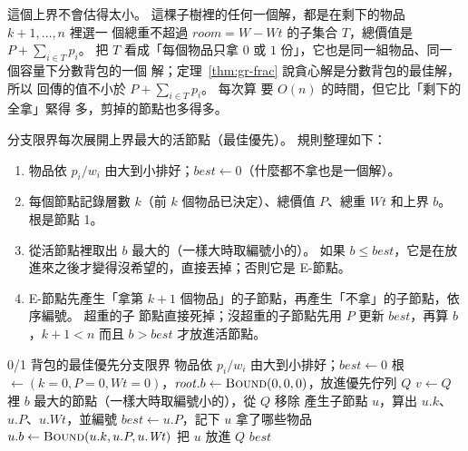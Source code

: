 這個上界不會估得太小。 這棵子樹裡的任何一個解，都是在剩下的物品 $k + 1, \ldots, n$ 裡選一
個總重不超過 $\mathit{room} = W - \mathit{Wt}$ 的子集合 $T$，總價值是 $P + \sum_{i \in T} p_i$。
把 $T$ 看成「每個物品只拿 $0$ 或 $1$ 份」，它也是同一組物品、同一個容量下分數背包的一個
解；定理~\ref{thm:gr-frac} 說貪心解是分數背包的最佳解，所以  回傳的值不小於
$P + \sum_{i \in T} p_i$。 每次算  要 $O(n)$ 的時間，但它比「剩下的全拿」緊得
多，剪掉的節點也多得多。

分支限界每次展開上界最大的活節點（最佳優先）。 規則整理如下：

\begin{enumerate}
\item 物品依 $p_i / w_i$ 由大到小排好；$\mathit{best} \gets 0$（什麼都不拿也是一個解）。
\item 每個節點記錄層數 $k$（前 $k$ 個物品已決定）、總價值 $P$、總重 $\mathit{Wt}$ 和上界
$b$。 根是節點 1。
\item 從活節點裡取出 $b$ 最大的（一樣大時取編號小的）。 如果 $b \le \mathit{best}$，它是在放
進來之後才變得沒希望的，直接丟掉；否則它是 E-節點。
\item E-節點先產生「拿第 $k + 1$ 個物品」的子節點，再產生「不拿」的子節點，依序編號。 超重的子
節點直接死掉；沒超重的子節點先用 $P$ 更新 $\mathit{best}$，再算 $b$，$k + 1 < n$ 而且 $b >
\mathit{best}$ 才放進活節點。
\end{enumerate}

\begin{pseudo}[label=alg:bk-knap-bb]{0/1 背包的最佳優先分支限界}
    \State 物品依 $p_i / w_i$ 由大到小排好；$\mathit{best} \gets 0$
    \State 根 $\gets (k = 0, P = 0, \mathit{Wt} = 0)$，$\mathit{root}.b \gets \Call{Bound}{0, 0, 0}$，放進優先佇列 $Q$
        \State $v \gets Q$ 裡 $b$ 最大的節點（一樣大時取編號小的），從 $Q$ 移除
         
                \State 產生子節點 $u$，算出 $u.k$、$u.P$、$u.\mathit{Wt}$，並編號
                 
                        \State $\mathit{best} \gets u.P$，記下 $u$ 拿了哪些物品
                    \EndIf
                    \State $u.b \gets \Call{Bound}{u.k, u.P, u.\mathit{Wt}}$
                        \State 把 $u$ 放進 $Q$
                    \EndIf
                \EndIf
            \EndFor
        \EndIf
    \EndWhile
    \State \Return $\mathit{best}$
\EndFunction
\end{pseudo}

